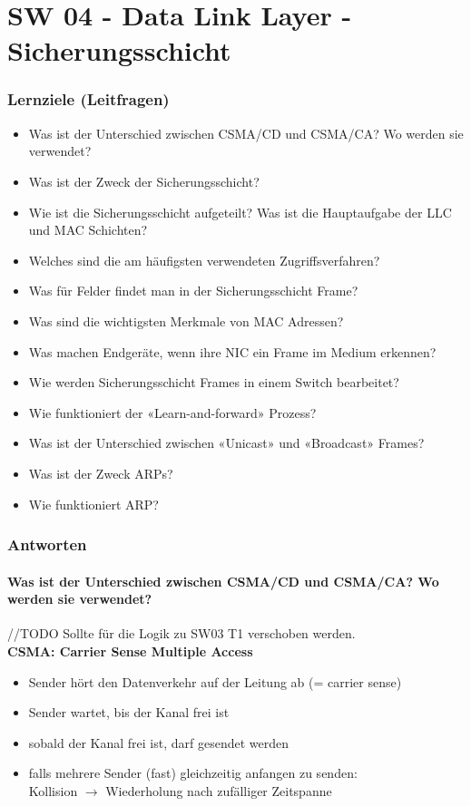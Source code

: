 \part{SW 04 - Data Link Layer - Sicherungsschicht}\label{part:sw04}
\section{Lernziele (Leitfragen)}
\begin{itemize}
    \item Was ist der Unterschied zwischen CSMA/CD und CSMA/CA? Wo werden sie verwendet?
    \item Was ist der Zweck der Sicherungsschicht?
    \item Wie ist die Sicherungsschicht aufgeteilt? Was ist die Hauptaufgabe der LLC und MAC Schichten?
    \item Welches sind die am häufigsten verwendeten Zugriffsverfahren?
    \item Was für Felder findet man in der Sicherungsschicht Frame?
    \item Was sind die wichtigsten Merkmale von MAC Adressen?
    \item Was machen Endgeräte, wenn ihre NIC ein Frame im Medium erkennen?
    \item Wie werden Sicherungsschicht Frames in einem Switch bearbeitet?
    \item Wie funktioniert der «Learn-and-forward» Prozess?
    \item Was ist der Unterschied zwischen «Unicast» und «Broadcast» Frames?
    \item Was ist der Zweck ARPs?
    \item Wie funktioniert ARP?
\end{itemize}

\section{Antworten}
\subsection*{Was ist der Unterschied zwischen CSMA/CD und CSMA/CA? Wo werden sie verwendet?}\label{sub:csma}
//TODO Sollte für die Logik zu SW03 T1 verschoben werden.\\

\textbf{CSMA: Carrier Sense Multiple Access}
\begin{itemize}
    \item Sender hört den Datenverkehr auf der Leitung ab (= carrier sense)
    \item Sender wartet, bis der Kanal frei ist
    \item sobald der Kanal frei ist, darf gesendet werden
    \item falls mehrere Sender (fast) gleichzeitig anfangen zu senden:\\Kollision $\rightarrow$ Wiederholung nach zufälliger Zeitspanne
\end{itemize}\,\\

